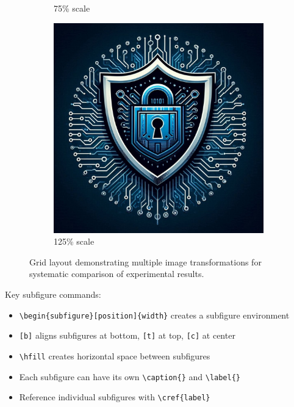 \begin{figure}[htbp]
\begin{subfigure}[b]{0.3\textwidth}
        \caption{75\% scale}
        \label{fig:grid_scale75}
    \end{subfigure}
    \hfill
    \begin{subfigure}[b]{0.3\textwidth}
        \centering
        \includegraphics[width=\textwidth,scale=1.25]{content/images/logo.jpg}
        \caption{125\% scale}
        \label{fig:grid_scale125}
    \end{subfigure}
    \caption{Grid layout demonstrating multiple image transformations for systematic comparison of experimental results.}
    \label{fig:grid_comparison}
\end{figure}

Key subfigure commands:
\begin{itemize}
    \item \verb+\begin{subfigure}[position]{width}+ creates a subfigure environment
    \item \verb+[b]+ aligns subfigures at bottom, \verb+[t]+ at top, \verb+[c]+ at center
    \item \verb+\hfill+ creates horizontal space between subfigures
    \item Each subfigure can have its own \verb+\caption{}+ and \verb+\label{}+
    \item Reference individual subfigures with \verb+\cref{label}+
\end{itemize}


